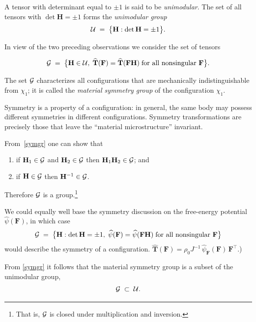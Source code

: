A tensor with determinant equal to \( \pm 1 \) is said to be \emph{unimodular}.
The set of all tensors with \(\det\mathbf{H} = \pm 1\) forms the \emph{unimodular group}
\[
\mathcal{U} \;=\; \bigl\{\mathbf{H} : \det\mathbf{H} = \pm 1\bigr\}.
\]

In view of the two preceding observations we consider the set of tensors  
\begin{definition}

\begin{equation}\label{symgr}
	\mathcal{G} \;=\; \bigl\{\mathbf{H} \in \mathcal{U},\;
\widehat{\mathbf{T}}(\mathbf{F}) = \widehat{\mathbf{T}}(\mathbf{F}\mathbf{H})
\;\text{for all nonsingular } \mathbf{F}\bigr\}.
\end{equation}

\end{definition}

The set \(\mathcal{G}\) characterizes all configurations that are mechanically indistinguishable from
\(\chi_1\); it is called the \emph{material symmetry group} of the configuration \(\chi_1\).

Symmetry is a property of a configuration: in general, the same body may possess
different symmetries in different configurations.  
Symmetry transformations are precisely those that leave the “material micro\-structure”
invariant.

From~\eqref{symgr} one can show that  
\begin{enumerate}
	\item  if \(\mathbf{H}_1 \in \mathcal{G}\) and \(\mathbf{H}_2 \in \mathcal{G}\) then \(\mathbf{H}_1\mathbf{H}_2 \in \mathcal{G}\); and  
\item  if \(\mathbf{H} \in \mathcal{G}\) then \(\mathbf{H}^{-1} \in \mathcal{G}\). 
\end{enumerate} 
Therefore \(\mathcal{G}\) is a group.\footnote{That is, \(\mathcal{G}\) is closed under multiplication and inversion.}

\medskip
We could equally well base the symmetry discussion on the free-energy potential
\(\widehat{\psi}(\mathbf{F})\), in which case  
\[
\mathcal{G} \;=\; \bigl\{\mathbf{H} : \det\mathbf{H} = \pm 1,\;
\widehat{\psi}(\mathbf{F}) = \widehat{\psi}(\mathbf{F}\mathbf{H})
\;\text{for all nonsingular } \mathbf{F}\bigr\}
\]
would describe the symmetry of a configuration.  
\(\widehat{\mathbf{T}}(\mathbf{F}) = \rho_0 J^{-1}\,\widehat{\psi}_{\mathbf{F}}(\mathbf{F})\,\mathbf{F}^\top\).)

\medskip

From \eqref{symgr}  it follows that the material symmetry group is a subset of the unimodular group,
\[
\mathcal{G} \;\subset\; \mathcal{U}. 
\]

